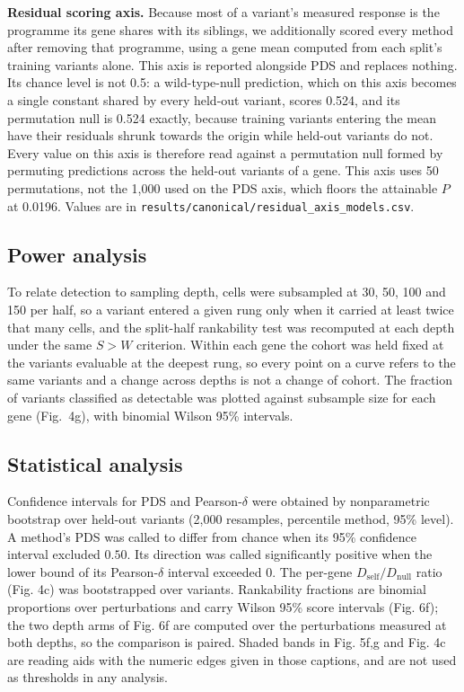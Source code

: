\documentclass[11pt,letterpaper]{article}
\begin{document}
\textbf{Residual scoring axis.} Because most of a variant's measured response is the programme its gene shares with its siblings, we additionally scored every method after removing that programme, using a gene mean computed from each split's training variants alone. This axis is reported alongside PDS and replaces nothing. Its chance level is not 0.5: a wild-type-null prediction, which on this axis becomes a single constant shared by every held-out variant, scores 0.524, and its permutation null is 0.524 exactly, because training variants entering the mean have their residuals shrunk towards the origin while held-out variants do not. Every value on this axis is therefore read against a permutation null formed by permuting predictions across the held-out variants of a gene. This axis uses 50 permutations, not the 1,000 used on the PDS axis, which floors the attainable $P$ at 0.0196. Values are in \texttt{results/canonical/residual\_axis\_models.csv}.

\subsection*{Power analysis}

To relate detection to sampling depth, cells were subsampled at 30, 50, 100 and 150 per half, so a variant entered a given rung only when it carried at least twice that many cells, and the split-half rankability test was recomputed at each depth under the same $S>W$ criterion. Within each gene the cohort was held fixed at the variants evaluable at the deepest rung, so every point on a curve refers to the same variants and a change across depths is not a change of cohort. The fraction of variants classified as detectable was plotted against subsample size for each gene (Fig.~4g), with binomial Wilson 95\% intervals.

\subsection*{Statistical analysis}

Confidence intervals for PDS and Pearson-$\delta$ were obtained by nonparametric bootstrap over held-out variants (2,000 resamples, percentile method, 95\% level). A method's PDS was called to differ from chance when its 95\% confidence interval excluded $0.50$. Its direction was called significantly positive when the lower bound of its Pearson-$\delta$ interval exceeded $0$. The per-gene $D_{\mathrm{self}}/D_{\mathrm{null}}$ ratio (Fig. 4c) was bootstrapped over variants. Rankability fractions are binomial proportions over perturbations and carry Wilson 95\% score intervals (Fig. 6f); the two depth arms of Fig. 6f are computed over the perturbations measured at both depths, so the comparison is paired. Shaded bands in Fig. 5f,g and Fig. 4c are reading aids with the numeric edges given in those captions, and are not used as thresholds in any analysis.
\end{document}

